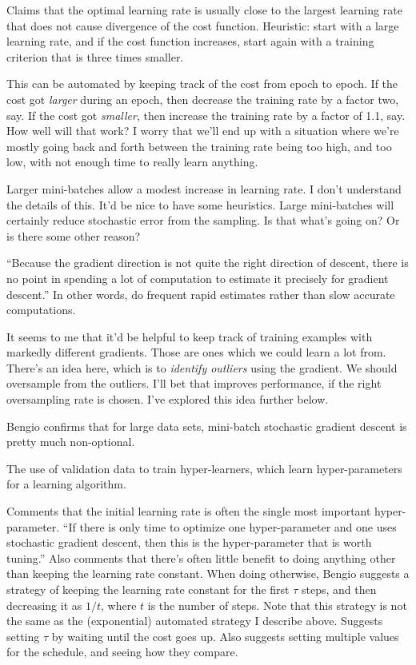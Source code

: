 \documentclass[12pt]{report}
\begin{document}
Claims that the optimal learning rate is usually close to the largest
learning rate that does not cause divergence of the cost function.
Heuristic: start with a large learning rate, and if the cost function
increases, start again with a training criterion that is three times
smaller.

This can be automated by keeping track of the cost from epoch to
epoch.  If the cost got \emph{larger} during an epoch, then decrease
the training rate by a factor two, say.  If the cost got
\emph{smaller}, then increase the training rate by a factor of 1.1,
say.  How well will that work?  I worry that we'll end up with a
situation where we're mostly going back and forth between the training
rate being too high, and too low, with not enough time to really learn
anything.

Larger mini-batches allow a modest increase in learning rate.  I don't
understand the details of this.  It'd be nice to have some heuristics.
Large mini-batches will certainly reduce stochastic error from the
sampling.  Is that what's going on?  Or is there some other reason?

``Because the gradient direction is not quite the right direction of
descent, there is no point in spending a lot of computation to
estimate it precisely for gradient descent.''  In other words, do
frequent rapid estimates rather than slow accurate computations.

It seems to me that it'd be helpful to keep track of training examples
with markedly different gradients.  Those are ones which we could
learn a lot from.  There's an idea here, which is to \emph{identify
  outliers} using the gradient.  We should oversample from the
outliers.  I'll bet that improves performance, if the right
oversampling rate is chosen.  I've explored this idea further below.

Bengio confirms that for large data sets, mini-batch stochastic
gradient descent is pretty much non-optional.

The use of validation data to train hyper-learners, which learn
hyper-parameters for a learning algorithm.

Comments that the initial learning rate is often the single most
important hyper-parameter.  ``If there is only time to optimize one
hyper-parameter and one uses stochastic gradient descent, then this is
the hyper-parameter that is worth tuning.''  Also comments that
there's often little benefit to doing anything other than keeping the
learning rate constant.  When doing otherwise, Bengio suggests a
strategy of keeping the learning rate constant for the first $\tau$
steps, and then decreasing it as $1/ t$, where $t$ is the number of
steps.  Note that this strategy is not the same as the (exponential)
automated strategy I describe above.  Suggests setting $\tau$ by
waiting until the cost goes up.  Also suggests setting multiple values
for the schedule, and seeing how they compare.
\end{document}
